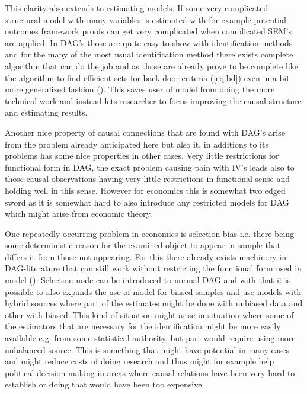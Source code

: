 \documentclass[main=english,12pt,a4paper,pdftex,econ,utf8]{aaltothesis}
\begin{document}
This clarity also extends to estimating models. If some very complicated structural model with many variables is estimated with for example potential outcomes framework proofs can get very complicated when complicated SEM's are applied. In DAG's those are quite easy to show with identification methods and for the many of the most usual identification method there exists complete algorithm that can do the job and as those are already prove to be complete like the algorithm to find efficient sets for back door criteria (\ref{eq:bd}) even in a bit more generalized fashion (\cite{Correa2017}). This saves user of model from doing the more technical work and instead lets researcher to focus improving the causal structure and estimating results.

Another nice property of causal connections that are found with DAG's arise from the problem already anticipated here but also it, in additions to its problems has some nice properties in other cases. Very little restrictions for functional form in DAG, the exact problem causing pain with IV's leads also to those causal observations having very little restrictions in functional sense and holding well in this sense. However for economics this is somewhat two edged sword as it is somewhat hard to also introduce any restricted models for DAG which might arise from economic theory.

One repeatedly occurring problem in economics is selection bias i.e. there being some deterministic reason for the examined object to appear in sample that differs it from those not appearing. For this there already exists machinery in DAG-literature that can still work without restricting the functional form used in model (\cite{Bareinboim2015}). Selection node can be introduced to normal DAG and with that it is possible to also expands the use of model for biased samples and use models with hybrid sources where part of the estimates might be done with unbiased data and other with biased. This kind of situation might arise in situation where some of the estimators that are necessary for the identification might be more easily available e.g. from some statistical authority, but part would require using more unbalanced source. This is something that might have potential in many cases and might reduce costs of doing research and thus might for example help political decision making in areas where causal relations have been very hard to establish or doing that would have been too expensive.
\end{document}
